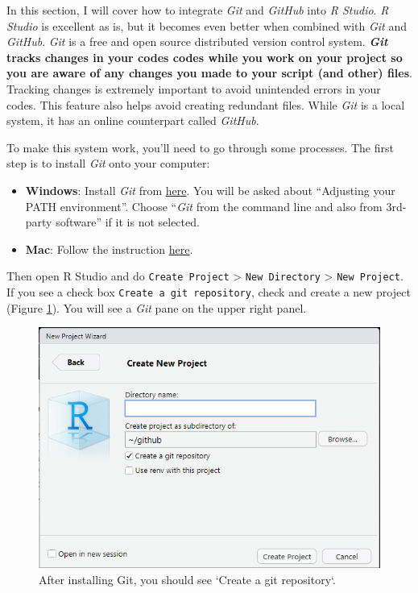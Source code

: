 \documentclass[
]{book}
\begin{document}
In this section, I will cover how to integrate \emph{Git} and \emph{GitHub} into \emph{R Studio}. \emph{R Studio} is excellent as is, but it becomes even better when combined with \emph{Git} and \emph{GitHub}. \emph{Git} is a free and open source distributed version control system. \textbf{\emph{Git}} \textbf{tracks changes in your codes codes while you work on your project so you are aware of any changes you made to your script (and other) files}. Tracking changes is extremely important to avoid unintended errors in your codes. This feature also helps avoid creating redundant files. While \emph{Git} is a local system, it has an online counterpart called \emph{GitHub}.

To make this system work, you'll need to go through some processes. The first step is to install \emph{Git} onto your computer:

\begin{itemize}
\item
  \textbf{Windows}: Install \emph{Git} from \href{https://gitforwindows.org/}{here}. You will be asked about ``Adjusting your PATH environment''. Choose ``\emph{Git} from the command line and also from 3rd-party software'' if it is not selected.
\item
  \textbf{Mac}: Follow the instruction \href{https://happygitwithr.com/install-git.html}{here}.
\end{itemize}

Then open R Studio and do \texttt{Create\ Project} \textgreater{} \texttt{New\ Directory} \textgreater{} \texttt{New\ Project}. If you see a check box \texttt{Create\ a\ git\ repository}, check and create a new project (Figure \ref{fig:gitcheck}). You will see a \emph{Git} pane on the upper right panel.

\begin{figure}

{\centering \includegraphics[width=8.24in]{image/git_image01} 

}

\caption{After installing Git, you should see `Create a git repository`.}\label{fig:gitcheck}
\end{figure}
\end{document}
